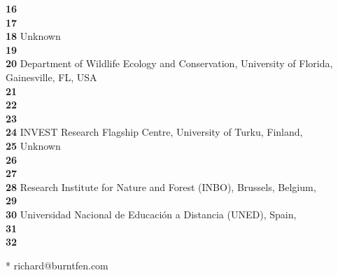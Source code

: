 \textbf{16} \\
\textbf{17} \\
\textbf{18} Unknown\\
\textbf{19} \\
\textbf{20} Department of Wildlife Ecology and Conservation, University of Florida, Gainesville, FL, USA \\
\textbf{21} \\
\textbf{22} \\
\textbf{23} \\
\textbf{24} INVEST Research Flagship Centre, University of Turku, Finland, \\
\textbf{25} Unknown\\
\textbf{26} \\
\textbf{27} \\
\textbf{28} Research Institute for Nature and Forest (INBO), Brussels, Belgium, \\
\textbf{29} \\
\textbf{30} Universidad Nacional de Educación a Distancia (UNED), Spain, \\
\textbf{31} \\
\textbf{32} 

* richard@burntfen.com
